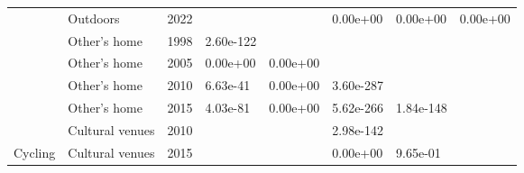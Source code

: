 \documentclass[preprint, 3p,
authoryear]{elsarticle} %
\begin{document}
\begin{table}
{\begin{tabular}[t]{llllllll}
 & Outdoors & 2022 &  &  & 0.00e+00 & 0.00e+00 & 0.00e+00\\

 & Other's home & 1998 & 2.60e-122 &  &  &  & \\

 & Other's home & 2005 & 0.00e+00 & 0.00e+00 &  &  & \\

 & Other's home & 2010 & 6.63e-41 & 0.00e+00 & 3.60e-287 &  & \\

 & Other's home & 2015 & 4.03e-81 & 0.00e+00 & 5.62e-266 & 1.84e-148 & \\

 & Cultural venues & 2010 &  &  & 2.98e-142 &  & \\

\multirow[t]{-27}{*}{\raggedright\arraybackslash Cycling} & Cultural venues & 2015 &  &  & 0.00e+00 & 9.65e-01 & \\
\bottomrule
\end{tabular}}
\end{table}


\end{document}
